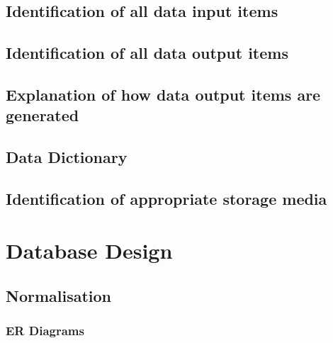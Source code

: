\subsection{Identification of all data input items}

\subsection{Identification of all data output items}

\subsection{Explanation of how data output items are generated}

\subsection{Data Dictionary}

\subsection{Identification of appropriate storage media}

\section{Database Design}

\subsection{Normalisation}

\pagebreak
\subsubsection{ER Diagrams}

